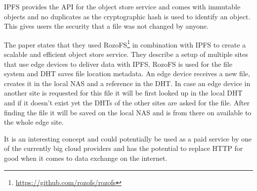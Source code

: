 IPFS provides the API for the object store service and comes with immutable objects and no duplicates as the cryptographic hash is used \cite{8014358} to identify an object. This gives users the security that a file was not changed by anyone.

The paper states that they used RozoFS\footnote{\url{https://github.com/rozofs/rozofs}} in combination with IPFS to create a scalable and efficient object store service.
They describe a setup of multiple sites that use edge devices to deliver data with IPFS, RozoFS is used for the file system and DHT saves file location metadata. An edge device receives a new file, creates it in the local NAS and a reference in the DHT. In case an edge device in another site is requested for this file it will be first looked up in the local DHT and if it doesn’t exist yet the DHTs of the other sites are asked for the file. After finding the file it will be saved on the local NAS and is from there on available to the whole edge site.

It is an interesting concept and could potentially be used as a paid service by one of the currently big cloud providers and has the potential to replace HTTP for good when it comes to data exchange on the internet.
